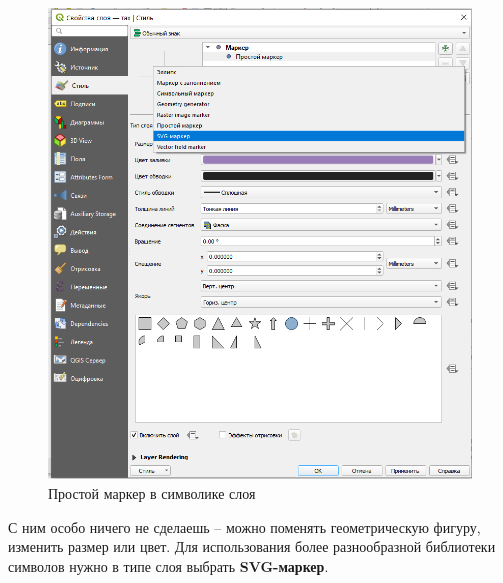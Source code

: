 \documentclass[
  12pt,
]{book}
\begin{document}
\begin{figure}
\centering
\includegraphics{images/symbology/Symbol_style_svg.png}
\caption{Простой маркер в символике слоя}
\end{figure}

С ним особо ничего не сделаешь -- можно поменять геометрическую фигуру, изменить размер или цвет. Для использования более разнообразной библиотеки символов нужно в типе слоя выбрать \textbf{SVG-маркер}.
\end{document}
